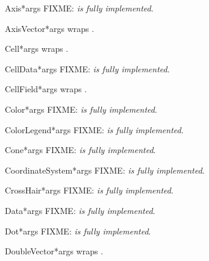 \documentclass{manual}
\begin{document}
\begin{classdesc}{Axis}{*args}
FIXME: \emph{is fully implemented}.
\end{classdesc}

\begin{classdesc}{AxisVector}{*args}
wraps .
\end{classdesc}

\begin{classdesc}{Cell}{*args}
wraps .
\end{classdesc}

\begin{classdesc}{CellData}{*args}
FIXME: \emph{is fully implemented}.
\end{classdesc}

\begin{classdesc}{CellField}{*args}
wraps .
\end{classdesc}

\begin{classdesc}{Color}{*args}
FIXME: \emph{is fully implemented}.
\end{classdesc}

\begin{classdesc}{ColorLegend}{*args}
FIXME: \emph{is fully implemented}.
\end{classdesc}

\begin{classdesc}{Cone}{*args}
FIXME: \emph{is fully implemented}.
\end{classdesc}

\begin{classdesc}{CoordinateSystem}{*args}
FIXME: \emph{is fully implemented}.
\end{classdesc}

\begin{classdesc}{CrossHair}{*args}
FIXME: \emph{is fully implemented}.
\end{classdesc}

\begin{classdesc}{Data}{*args}
FIXME: \emph{is fully implemented}.
\end{classdesc}

\begin{classdesc}{Dot}{*args}
FIXME: \emph{is fully implemented}.
\end{classdesc}

\begin{classdesc}{DoubleVector}{*args}
wraps .
\end{classdesc}
\end{document}
